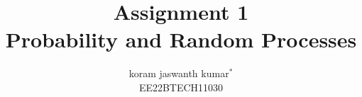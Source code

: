 \documentclass[journal,12pt,twocolumn]{IEEEtran}
\theoremstyle{remark}
\begin{document}
 
  
  
  
  
 \vspace{3cm} 
  
 \title{ 
 Assignment 1\\Probability and Random Processes 
 } 
 \author{koram jaswanth kumar$^{*}$\\EE22BTECH11030%
          
 }         
  
  
  
  
\end{document}
